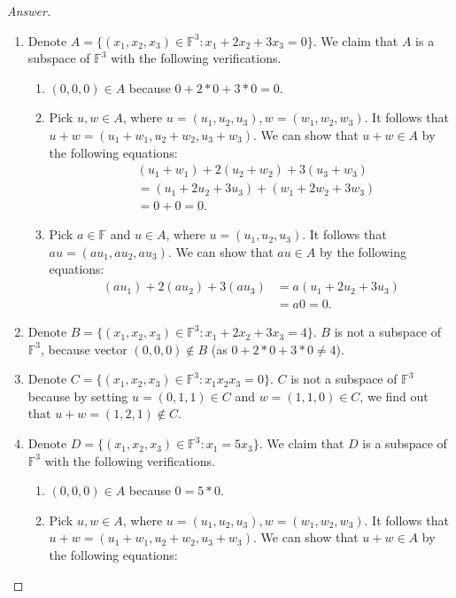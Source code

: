 \begin{proof}[Answer]
\begin{enumerate}[label=(\alph*)]
\item Denote $A=\{(x_1,x_2,x_3)\in\mathbb{F}^3: x_1+2x_2+3x_3=0\}$. We claim that $A$ is a subspace of $\mathbb{F}^3$ with the following verifications.
\begin{enumerate}[label=(\roman*)]
\item $(0,0,0)\in A$ because $0+2*0+3*0=0$.
\item Pick $u,w\in A$, where $u=(u_1,u_2,u_3), w=(w_1,w_2,w_3)$. It follows that $u+w=(u_1+w_1, u_2+w_2, u_3+w_3)$. We can show that $u+w\in A$ by the following equations:
\begin{equation*}
\begin{split}
&(u_1+w_1)+2(u_2+w_2)+3(u_3+w_3)\\
&=(u_1+2u_2+3u_3)+(w_1+2w_2+3w_3)\\
&=0+0=0.
\end{split}
\end{equation*}
\item Pick $a\in \mathbb{F}$ and $u\in A$, where $u=(u_1,u_2,u_3)$. It follows that $au=(au_1,au_2,au_3)$. We can show that $au\in A$ by the following equations:
\begin{equation*}
\begin{split}
(au_1)+2(au_2)+3(au_3)&=a(u_1+2u_2+3u_3)\\
&=a0=0.
\end{split}
\end{equation*}
\end{enumerate}
\item Denote $B=\{(x_1,x_2,x_3)\in\mathbb{F}^3: x_1+2x_2+3x_3=4\}$. $B$ is not a subspace of $\mathbb{F}^3$, because vector $(0,0,0)\notin B$ (as $0+2*0+3*0\ne 4$).
\item Denote $C=\{(x_1,x_2,x_3)\in\mathbb{F}^3: x_1x_2x_3=0\}$. $C$ is not a subspace of $\mathbb{F}^3$ because by setting $u=(0,1,1)\in C$ and $w=(1,1,0)\in C$, we find out that $u+w=(1,2,1) \notin C$.
\item Denote $D=\{(x_1,x_2,x_3)\in\mathbb{F}^3: x_1=5x_3\}$. We claim that $D$ is a subspace of $\mathbb{F}^3$ with the following verifications.
\begin{enumerate}[label=(\roman*)]
\item $(0,0,0)\in A$ because $0=5*0$.
\item Pick $u,w\in A$, where $u=(u_1,u_2,u_3), w=(w_1,w_2,w_3)$. It follows that $u+w=(u_1+w_1, u_2+w_2, u_3+w_3)$. We can show that $u+w\in A$ by the following equations:

\end{enumerate}
\end{enumerate}
\end{proof}
